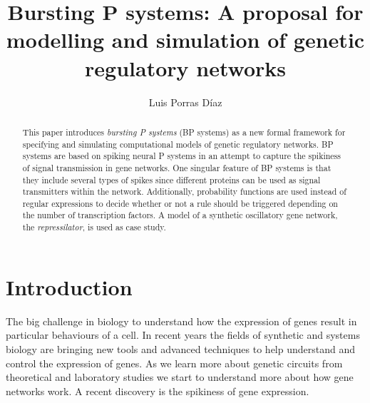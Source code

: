 \documentclass[runningheads,a4paper]{llncs}
\begin{document}

  \title{Bursting P systems: A proposal for modelling and simulation of genetic regulatory networks}


  \author{Luis Porras D\'iaz}
 
 


  \maketitle              %

  \begin{abstract}
    This paper introduces \emph{bursting P systems} (BP systems) as a new formal
    framework for specifying and simulating computational models of genetic
    regulatory networks. BP systems are based on spiking neural P systems in an
    attempt to capture the spikiness of signal transmission in gene networks. One
    singular feature of BP systems is that they include several types of spikes
    since different proteins can be used as signal transmitters within the network.
    Additionally, probability functions are used instead of regular expressions to
    decide whether or not a rule should be triggered depending on the number of
    transcription factors. A model of a synthetic oscillatory gene network, the
    \textit{repressilator}, is used as case study.
  \end{abstract}
 
  \section{Introduction}
  \color{gray}
  The big challenge in biology to understand how the expression of genes result in 
  particular behaviours of a cell. 
  In recent years the fields of synthetic and systems biology are bringing new
  tools and advanced techniques to help understand and control the expression of genes. 
  As we learn more about genetic circuits from theoretical and laboratory studies 
  we start to understand more about how gene networks work. 
  A recent discovery is the spikiness of gene expression. 
\end{document}
